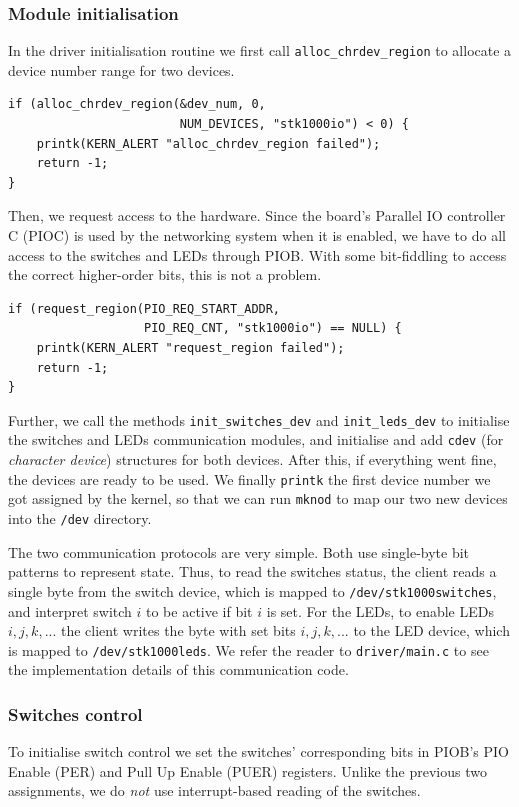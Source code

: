 \documentclass[a4paper,10pt]{article}
\newcommand{\isrc}[1]{\texttt{#1}}
\begin{document}
\subsubsection{Module initialisation}
In the driver initialisation routine we first call
\isrc{alloc\_chrdev\_region} to allocate a device number range for two
devices.
\begin{lstlisting}
if (alloc_chrdev_region(&dev_num, 0, 
                        NUM_DEVICES, "stk1000io") < 0) {
    printk(KERN_ALERT "alloc_chrdev_region failed");
    return -1;
}
\end{lstlisting}
Then, we request access to the hardware.
Since the board's Parallel IO controller C (PIOC) is used by the networking
system when it is enabled, we have to do all access to the switches and LEDs
through PIOB. With some bit-fiddling to access the correct
higher-order bits, this is not a problem.
\begin{lstlisting}
if (request_region(PIO_REQ_START_ADDR, 
                   PIO_REQ_CNT, "stk1000io") == NULL) {
    printk(KERN_ALERT "request_region failed");
    return -1;
}
\end{lstlisting}
Further, we call the methods \isrc{init\_switches\_dev} and
\isrc{init\_leds\_dev} to initialise the switches and LEDs communication
modules, and initialise and add \isrc{cdev} (for \emph{character device})
structures for both devices. 
After this, if everything went fine, the devices are ready to be used. We
finally \isrc{printk} the first device number we got assigned by the kernel,
so that we can run \isrc{mknod} to map our two new devices into the
\texttt{/dev} directory.

The two communication protocols are very simple. Both use single-byte bit
patterns to represent state. Thus, to read the switches status, the client
reads a single byte from the switch device, which is mapped to
\texttt{/dev/stk1000switches}, and interpret switch $i$ to be active if bit
$i$ is set. For the LEDs, to enable LEDs $i, j, k,...$ the client writes the
byte with set bits $i, j, k, ...$ to the LED device, which is mapped to
\texttt{/dev/stk1000leds}.  We refer the reader to \texttt{driver/main.c} to
see the implementation details of this communication code. 

\subsubsection{Switches control}
To initialise switch control we set the switches' corresponding bits in PIOB's
PIO Enable (PER) and Pull Up Enable (PUER) registers. Unlike the previous two
assignments, we do \emph{not} use interrupt-based reading of the switches.
\end{document}
